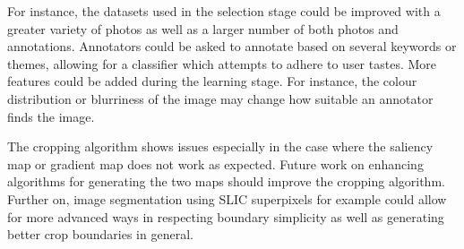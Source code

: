 For instance, the datasets used in the selection stage could be improved with a
greater variety of photos as well as a larger number of both photos and
annotations.
Annotators could be asked to annotate based on several keywords or themes,
allowing for a classifier which attempts to adhere to user tastes.
More features could be added during the learning stage.
For instance, the colour distribution or blurriness of the image may change how
suitable an annotator finds the image.

The cropping algorithm shows issues especially in the case where the saliency
map or gradient map does not work as expected.
Future work on enhancing algorithms for generating the two maps should improve
the cropping algorithm.
Further on, image segmentation using SLIC superpixels for example could allow
for more advanced ways in respecting boundary simplicity as well as generating
better crop boundaries in general.

